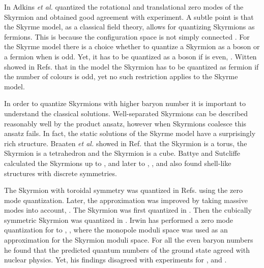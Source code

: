 \documentclass[a4paper,12pt]{article}
\begin{document}
In \cite{Adkins:1983ya, Adkins:1984hy} Adkins {\it et al.} quantized
the rotational and translational zero modes of the \coordHE{} Skyrmion and
obtained good agreement with experiment. A subtle point is that the
Skyrme model, as a classical field theory, allows for quantizing
Skyrmions as fermions. This is because the configuration space is not
simply connected \cite{Finkelstein:1968hy}. For the \coordHE{} Skyrme
model there is a choice whether to quantize a Skyrmion as a boson or a
fermion when \coordHE{} is odd. Yet, it has to be quantized as a boson if \coordHE{}
is even, \cite{Giulini:1993gd}.  Witten showed in
Refs. \cite{Witten:1983tw, Witten:1983tx} that in the \coordHE{} model
the \coordHE{} Skyrmion has to be quantized as fermion if the number of
colours is odd, yet no such restriction applies to the \coordHE{} Skyrme
model. 

In order to quantize Skyrmions with higher baryon number it is
important to understand the classical solutions.  Well-separated
Skyrmions can be described reasonably well by the product ansatz,
however when Skyrmions coalesce this ansatz fails. In fact, 
the static solutions of the Skyrme model have a surprisingly rich 
structure.  
Braaten {\it et al.} showed
in Ref. \cite{Braaten:1990rg} 
that the \coordHE{} Skyrmion is a torus, the
\coordHE{} Skyrmion is a tetrahedron and the \coordHE{} Skyrmion is a
cube. Battye and Sutcliffe calculated the Skyrmions up to \coordHE{},
\cite{Battye:1997qq} and later to \coordHE{}, \cite{Battye:2000se}, and
also found shell-like structures with discrete symmetries. 

The \coordHE{} Skyrmion with toroidal symmetry was quantized in Refs.
\cite{Braaten:1988cc,Verbaarschot:1987au} using the zero mode
quantization. Later, the approximation was improved by taking massive
modes into account, \cite{Leese:1995hb}.  The \coordHE{} Skyrmion was first
quantized in \cite{Carson:1991yv}. Then the cubically symmetric \coordHE{}
Skyrmion was quantized in \cite{Walhout:1992gr}. Irwin has performed a
zero mode quantization for \coordHE{} to \coordHE{}, \cite{Irwin:1998bs}, where
the monopole moduli space was used as an approximation for the Skyrmion
moduli space. For all the even baryon numbers he found that the
predicted quantum numbers of the ground state agreed with nuclear
physics.  Yet, his findings disagreed with experiments for \coordHE{}, \coordHE{}
and \coordHE{}. 
\end{document}
